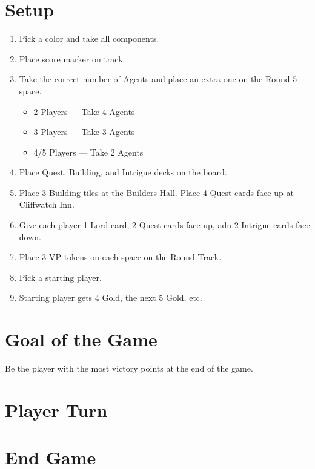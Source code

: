 \documentclass[12pt]{article}
\newenvironment{enumerateCustom}
{\begin{enumerate}
  \setlength{\itemsep}{1pt}
  \setlength{\parskip}{0pt}
  \setlength{\parsep}{0pt}}
{\end{enumerate}}
\newenvironment{itemizeCustom}
{\begin{itemize}
  \setlength{\itemsep}{1pt}
  \setlength{\parskip}{0pt}
  \setlength{\parsep}{0pt}}
{\end{itemize}}
\begin{document}
\begin{mdframed}[style = customFrame]
\begin{multicols*}{2}

\section*{Setup}
\begin{enumerateCustom}
	\item Pick a color and take all components. 
	\item Place score marker on track.
	\item Take the correct number of Agents and place an extra one on the Round 5 space.
		\begin{itemizeCustom}
			\item 2 Players --- Take 4 Agents
			\item 3 Players --- Take 3 Agents
			\item 4/5 Players --- Take 2 Agents
		\end{itemizeCustom}
	\item Place Quest, Building, and Intrigue decks on the board.
	\item Place 3 Building tiles at the Builders Hall. Place 4 Quest cards face up at Cliffwatch Inn.
	\item Give each player 1 Lord card, 2 Quest cards face up, adn 2 Intrigue cards face down.
	\item Place 3 VP tokens on each space on the Round Track.
	\item Pick a starting player.
	\item Starting player gets 4 Gold, the next 5 Gold, etc.
\end{enumerateCustom}

\section*{Goal of the Game}
Be the player with the most victory points at the end of the game.

\section*{Player Turn}
\section*{End Game}

\end{multicols*}
\end{mdframed}
\end{document}
